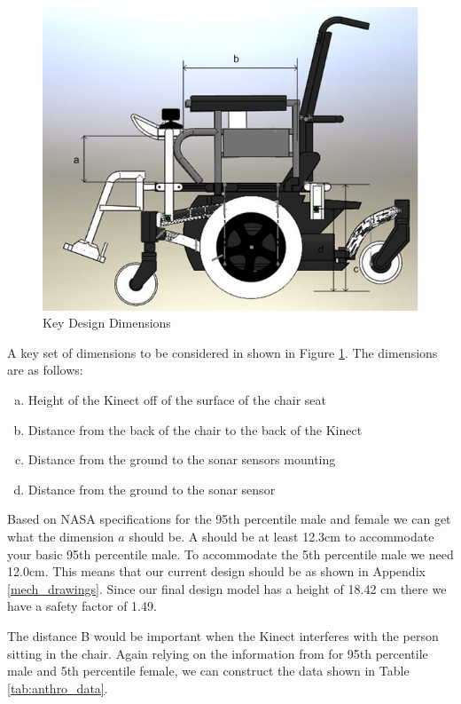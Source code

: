 \documentclass[oneside,final,a4paper]{report}
\begin{document}
\begin{figure}[hbt]
 \centering
 \includegraphics[scale=0.5]{WheelChair_Dimensions}
 \caption{Key Design Dimensions}\label{fig:Chair_Dims}
\end{figure}

A key set of dimensions to be considered in shown in Figure \ref{fig:Chair_Dims}. The dimensions are as follows:
\begin{enumerate}[(a)]
\item Height of the Kinect off of the surface of the chair seat
\item Distance from the back of the chair to the back of the Kinect
\item Distance from the ground to the sonar sensors mounting
\item Distance from the ground to the sonar sensor
\end{enumerate}

Based on NASA specifications for the 95th percentile male \cite{NASA} and female we can get what the dimension $a$ should be. A should be at least 12.3cm to accommodate your basic 95th percentile male. To accommodate the 5th percentile male we need 12.0cm. This means that our current design should be as shown in Appendix \ref{mech_drawings}. Since our final design model has a height of 18.42 cm there we have a safety factor of 1.49.

The distance B would be important when the Kinect interferes with the person sitting in the chair. Again relying on the information from \cite{NASA} for 95th percentile male and 5th percentile female, we can construct the data shown in Table \ref{tab:anthro_data}.
\end{document}
